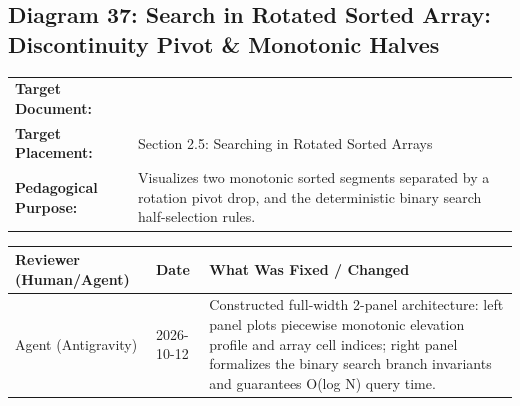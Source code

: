 \documentclass[11pt,a4paper]{article}
\newcommand{\breadcrumb}[3]{
    \par\vspace{0.15cm}
    \noindent\begin{tabularx}{\textwidth}{|l|X|}
    \hline
    \textbf{Target Document:} & \texttt{\detokenize{#1}} \\
    \textbf{Target Placement:} & #2 \\
    \textbf{Pedagogical Purpose:} & #3 \\
    \hline
    \end{tabularx}
    \vspace{0.15cm}\par
}
\newcommand{\diagramaudit}[3]{
    \par\vspace{0.12cm}
    \noindent\begin{tabularx}{\textwidth}{|l|l|>{\raggedright\arraybackslash}X|}
    \hline
    \textbf{Reviewer (Human/Agent)} & \textbf{Date} & \textbf{What Was Fixed / Changed} \\ \hline
    #1 & #2 & #3 \\ \hline
    \end{tabularx}
    \vspace{0.12cm}\par
}
\begin{document}
\newpage
\newpage
\newpage

\subsection[Diagram 37: Search in Rotated Sorted Array]{Diagram 37: Search in Rotated Sorted Array: Discontinuity Pivot \& Monotonic Halves}

\breadcrumb{08.binary_search.tex}{Section 2.5: Searching in Rotated Sorted Arrays}{Visualizes two monotonic sorted segments separated by a rotation pivot drop, and the deterministic binary search half-selection rules.}

\diagramaudit{Agent (Antigravity)}{2026-10-12}{Constructed full-width 2-panel architecture: left panel plots piecewise monotonic elevation profile and array cell indices; right panel formalizes the binary search branch invariants and guarantees O(log N) query time.}
\end{document}
